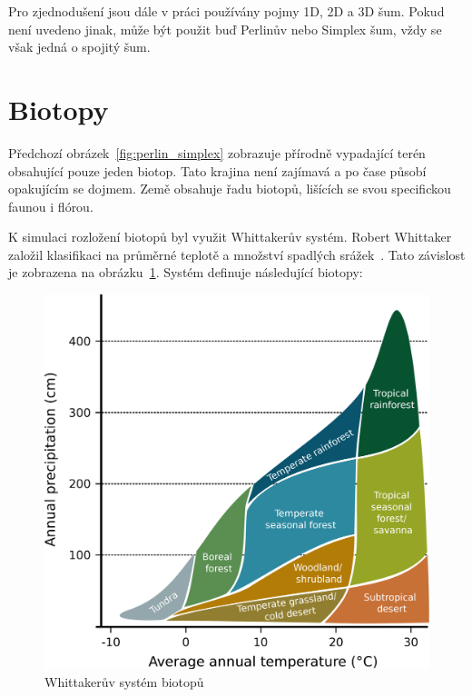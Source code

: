 \documentclass[thesis=M,czech]{FITthesis}[2019/12/23]
\begin{document}
Pro zjednodušení jsou dále v práci používány pojmy 1D, 2D a 3D šum. Pokud není uvedeno jinak, může být použit buď Perlinův nebo Simplex šum, vždy se však jedná o spojitý šum.

\section{Biotopy}

Předchozí obrázek~\ref{fig:perlin_simplex} zobrazuje přírodně vypadající terén obsahující pouze jeden biotop. Tato krajina není zajímavá a po čase působí opakujícím se dojmem. Země obsahuje řadu biotopů, lišících se svou specifickou faunou i flórou. 

K simulaci rozložení biotopů byl využit Whittakerův systém. Robert Whittaker založil klasifikaci na průměrné teplotě a množství spadlých srážek~\cite{whitt}. Tato závislost je zobrazena na obrázku~\ref{fig:whitt_biomes}. Systém definuje následující biotopy:

\begin{figure}\centering
	\includegraphics[width=\textwidth]{images/world_gen/whitt_biomes}
	\caption[Whittakerův systém biotopů]{Whittakerův systém biotopů~\cite{whitt_image}}\label{fig:whitt_biomes}
\end{figure}
\end{document}
